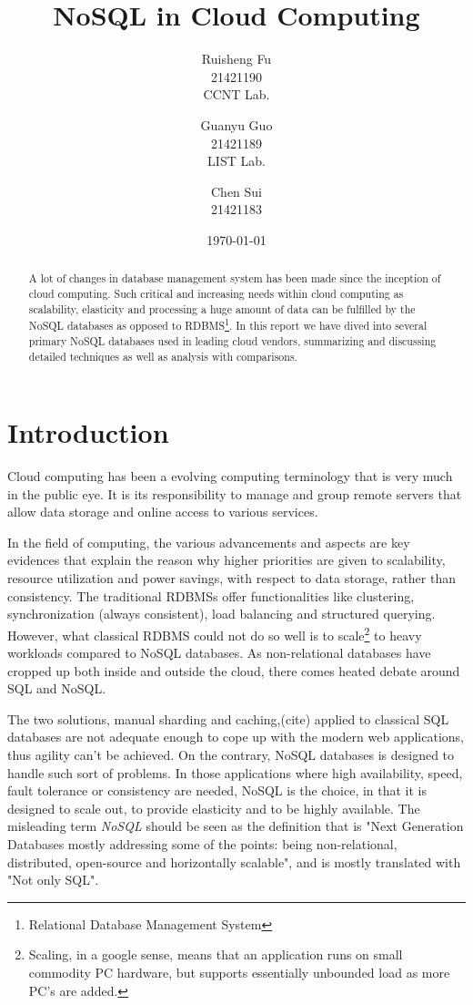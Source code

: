 \documentclass[12pt,letter]{article}
\author{Ruisheng Fu\\21421190\\CCNT Lab.
\and
Guanyu Guo\\21421189\\LIST Lab.
\and
Chen Sui\\21421183}
\title{NoSQL in Cloud Computing}
\date{\today}
\begin{document}
\maketitle
\tableofcontents

\begin{abstract}
A lot of changes in database management system has been made since the inception of cloud computing. Such critical and increasing needs within cloud computing as scalability, elasticity and  processing a huge amount of data can be fulfilled by the NoSQL databases as opposed to RDBMS\footnote{Relational Database Management System}. In this report we have dived into several primary NoSQL databases used in leading cloud vendors, summarizing and discussing detailed techniques as well as analysis with comparisons.
\end{abstract}

\section{Introduction}
Cloud computing has been a evolving computing terminology that is very much in the public eye. It is its responsibility to manage and group remote servers that allow data storage and online access to various services. 

In the field of computing, the various advancements and aspects are key evidences that explain the reason why higher priorities are given to scalability, resource utilization and power savings, with respect to data storage, rather than consistency. The traditional RDBMSs offer functionalities like clustering, synchronization (always consistent), load balancing and structured querying. However, what classical RDBMS could not do so well is to scale\footnote{Scaling, in a google sense, means that an application runs on small commodity PC hardware, but supports essentially unbounded load as more PC’s are added. } to heavy workloads compared to NoSQL databases. As non-relational databases have cropped up both inside and outside the cloud, there comes heated debate around SQL and NoSQL.\citep{Bain2009}

The two solutions, manual sharding and caching,(cite) applied to classical SQL databases are not adequate enough to cope up with the modern web applications, thus agility can't be achieved. On the contrary, NoSQL databases is designed to handle such sort of problems. In those applications where high availability, speed, fault tolerance or consistency are needed, NoSQL is the choice, in that it is designed to scale out, to provide elasticity and to be highly available. The misleading term \textit{NoSQL} should be seen as the definition\citep{Unknown2012} that is "Next Generation Databases mostly addressing some of the points: being non-relational, distributed, open-source and horizontally scalable", and is mostly translated with "Not only SQL".
\end{document}
